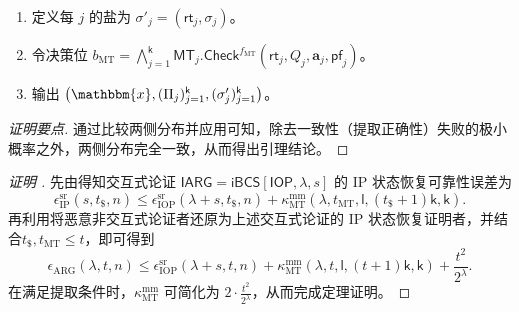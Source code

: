 \documentclass[american,singlepageview]{snargs-book-zh}
\renewcommand{\vec}[1]{\bm{#1}}
\newcommand{\DecisionBit}{b}
\newcommand{\Instance}{\mathbbm{x}}
\newcommand{\InstanceSize}{n}
\newcommand{\ProtoSoundnessError}{\epsilon}
\newcommand{\ProtoKnowledgeError}{\kappa}
\newcommand{\ProtoRoundComplexity}{\mathsf{k}}
\newcommand{\ProtoProofLength}{\mathsf{l}}
\newcommand{\SRSuperscript}{\mathrm{sr}}
\newcommand{\ProtoSRSoundnessError}{\ProtoSoundnessError^{\SRSuperscript}}
\newcommand{\IPSubscript}{\scriptscriptstyle\mathrm{IP}}
\newcommand{\IOPSymbol}{\mathsf{IOP}}
\newcommand{\IOPSubscript}{\scriptscriptstyle\mathrm{IOP}}
\newcommand{\IOPString}{\Pi}
\newcommand{\IOPEntry}{a}
\newcommand{\IOPEntries}{\vec{\IOPEntry}}
\newcommand{\IOPQuerySet}{Q}
\newcommand{\IOPRoundComplexity}{\ProtoRoundComplexity}
\newcommand{\IOPProofLength}{\ProtoProofLength}
\newcommand{\ARGSubscript}{\scriptscriptstyle\mathrm{ARG}}
\newcommand{\ARGSoundnessError}{\ProtoSoundnessError_{\ARGSubscript}}
\newcommand{\IARGSymbol}{\mathsf{IARG}}
\newcommand{\ROFunction}{f}
\newcommand{\ROQueryBound}{t}
\newcommand{\SecurityParameter}{\lambda}
\newcommand{\PrivacyParameter}{s}
\newcommand{\ROTrace}{\mathsf{tr}}
\newcommand{\ROTreeSymbol}{\MTSubscript}
\newcommand{\RORandSymbol}{\scriptscriptstyle \mathsf{\$}}
\newcommand{\ROTreeFunction}{\ROFunction_{\ROTreeSymbol}}
\newcommand{\ROTreeQueryBound}{\ROQueryBound_{\ROTreeSymbol}}
\newcommand{\RORandQueryBound}{\ROQueryBound_{\RORandSymbol}}
\newcommand{\MTSymbol}{\mathsf{MT}}
\newcommand{\MTSubscript}{{\scriptscriptstyle\mathrm{MT}}}
\newcommand{\MTMultiExtractor}{\MTSymbol.\mathsf{MultiExtract}}
\newcommand{\MTCommitment}{\mathsf{rt}}
\newcommand{\MTTrapdoor}{\mathsf{td}}
\newcommand{\MTProof}{\mathsf{pf}}
\newcommand{\MTMultiMultiSymbol}{\scriptscriptstyle{\mathrm{mm}}}
\newcommand{\MTMultiMultiExtractionError}{\ProtoKnowledgeError_{\MTSubscript}^{\MTMultiMultiSymbol}}
\newcommand{\MTIdxCheck}[1]{\MTSymbol_{#1}.\mathsf{Check}}
\newcommand{\FormatTransName}[1]{\bm{\mathsf{#1}}}
\newcommand{\IBCSSymbol}{\FormatTransName{iBCS}}
\newcommand{\FormatTransInputs}[3]{[#1,#2,#3]}
\newcommand{\IBCSTransformation}[3]{\IBCSSymbol\FormatTransInputs{#1}{#2}{#3}}
\newcommand{\SRSaltString}{\sigma}
\newcommand{\IPSRSoundnessError}{\ProtoSRSoundnessError_{\IPSubscript}}
\newcommand{\IOPSRSoundnessError}{\ProtoSRSoundnessError_{\IOPSubscript}}
\newcommand{\MTMultiMultiExtractabilityShortExpression}[2]{2 \cdot \frac{#2^2}{2^{#1}}}
\newcommand{\FSErrorExpression}[1][\ROQueryBound]{\frac{#1^2}{2^{\SecurityParameter}}}
\begin{document}
\begin{construction}
\begin{enumerate}[noitemsep]
\begin{enumerate}[noitemsep]
      \(\bigl((\IOPString_j,\MTTrapdoor_j)\bigr)_{j=1}^{\IOPRoundComplexity}
        =\MTMultiExtractor((1,\dots,\IOPRoundComplexity),
           (\MTCommitment_j)_{j=1}^{\IOPRoundComplexity},\ROTrace')\)。
    \item 定义每 \(j\) 的盐为
      \(\SRSaltString'_j=(\MTCommitment_j,\SRSaltString_j)\)。
    \item 令决策位
      \(\DecisionBit_{\MTSubscript}
        =\bigwedge_{j=1}^{\IOPRoundComplexity}
         \MTIdxCheck{j}^{\ROTreeFunction}
          (\MTCommitment_j,\IOPQuerySet_j,\IOPEntries_j,\MTProof_j)\)。
    \item 输出 \(\bigl(\Instance,(\IOPString_j)_{j=1}^{\IOPRoundComplexity},
      (\SRSaltString'_j)_{j=1}^{\IOPRoundComplexity}\bigr)\)。
  \end{enumerate}
\end{enumerate}
\end{construction}

\begin{proof}[证明要点]
通过比较两侧分布并应用可知，除去一致性（提取正确性）失败的极小概率之外，两侧分布完全一致，从而得出引理结论。
\end{proof}

\begin{proof}[证明 ]
先由得知交互式论证
\(\IARGSymbol=\IBCSTransformation{\IOPSymbol}{\SecurityParameter}{\PrivacyParameter}\)
的 IP 状态恢复可靠性误差为
\[
\IPSRSoundnessError(\PrivacyParameter,\RORandQueryBound,\InstanceSize)
\le
\IOPSRSoundnessError(\SecurityParameter+\PrivacyParameter,\RORandQueryBound,\InstanceSize)
+
\MTMultiMultiExtractionError(\SecurityParameter,\ROTreeQueryBound,\IOPProofLength,
  (\RORandQueryBound+1)\IOPRoundComplexity,\IOPRoundComplexity).
\]
再利用将恶意非交互式论证者还原为上述交互式论证的 IP 状态恢复证明者，并结合\(\RORandQueryBound,\ROTreeQueryBound\le\ROQueryBound\)，即可得到
\[
\ARGSoundnessError(\SecurityParameter,\ROQueryBound,\InstanceSize)
\le
\IOPSRSoundnessError(\SecurityParameter+\PrivacyParameter,\ROQueryBound,\InstanceSize)
+
\MTMultiMultiExtractionError(\SecurityParameter,\ROQueryBound,\IOPProofLength,
  (\ROQueryBound+1)\IOPRoundComplexity,\IOPRoundComplexity)
+ \FSErrorExpression.
\]
在满足提取条件时，\(\MTMultiMultiExtractionError\) 可简化为 \(\MTMultiMultiExtractabilityShortExpression{\SecurityParameter}{\ROQueryBound}\)，从而完成定理证明。
\end{proof}
\end{document}

